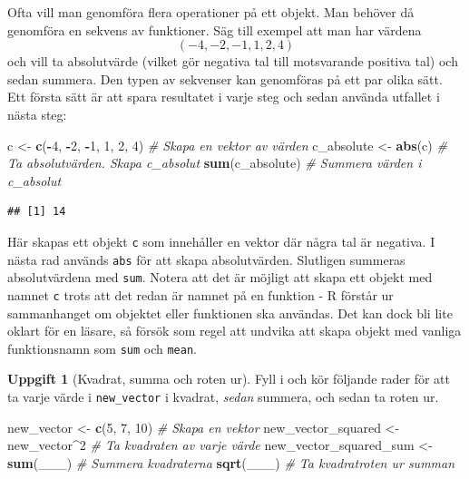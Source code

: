 \documentclass[
]{book}
\newenvironment{Shaded}{\begin{snugshade}}{\end{snugshade}}
\newcommand{\CommentTok}[1]{\textcolor[rgb]{0.56,0.35,0.01}{\textit{#1}}}
\newcommand{\DecValTok}[1]{\textcolor[rgb]{0.00,0.00,0.81}{#1}}
\newcommand{\FunctionTok}[1]{\textcolor[rgb]{0.13,0.29,0.53}{\textbf{#1}}}
\newcommand{\NormalTok}[1]{#1}
\newcommand{\OtherTok}[1]{\textcolor[rgb]{0.56,0.35,0.01}{#1}}
\newcommand{\SpecialCharTok}[1]{\textcolor[rgb]{0.81,0.36,0.00}{\textbf{#1}}}
\theoremstyle{definition}
\theoremstyle{definition}
\theoremstyle{definition}
\newtheorem{exercise}{Uppgift}[chapter]
\theoremstyle{definition}
\theoremstyle{remark}
\begin{document}
Ofta vill man genomföra flera operationer på ett objekt. Man behöver då genomföra en sekvens av funktioner. Säg till exempel att man har värdena \[(-4, -2, -1, 1, 2, 4)\] och vill ta absolutvärde (vilket gör negativa tal till motsvarande positiva tal) och sedan summera.
Den typen av sekvenser kan genomföras på ett par olika sätt. Ett första sätt är att spara resultatet i varje steg och sedan använda utfallet i nästa steg:

\begin{Shaded}
\begin{Highlighting}[]
\NormalTok{c }\OtherTok{\textless{}{-}} \FunctionTok{c}\NormalTok{(}\SpecialCharTok{{-}}\DecValTok{4}\NormalTok{, }\SpecialCharTok{{-}}\DecValTok{2}\NormalTok{, }\SpecialCharTok{{-}}\DecValTok{1}\NormalTok{, }\DecValTok{1}\NormalTok{, }\DecValTok{2}\NormalTok{, }\DecValTok{4}\NormalTok{)   }\CommentTok{\# Skapa en vektor av värden}
\NormalTok{c\_absolute }\OtherTok{\textless{}{-}} \FunctionTok{abs}\NormalTok{(c)          }\CommentTok{\# Ta absolutvärden. Skapa c\_absolut}
\FunctionTok{sum}\NormalTok{(c\_absolute)               }\CommentTok{\# Summera värden i c\_absolut}
\end{Highlighting}
\end{Shaded}

\begin{verbatim}
## [1] 14
\end{verbatim}

Här skapas ett objekt \texttt{c} som innehåller en vektor där några tal är negativa. I nästa rad används \texttt{abs} för att skapa absolutvärden. Slutligen summeras absolutvärdena med \texttt{sum}.
Notera att det är möjligt att skapa ett objekt med namnet \texttt{c} trots att det redan är namnet på en funktion - R förstår ur sammanhanget om objektet eller funktionen ska användas. Det kan dock bli lite oklart för en läsare, så försök som regel att undvika att skapa objekt med vanliga funktionsnamn som \texttt{sum} och \texttt{mean}.

\begin{exercise}[Kvadrat, summa och roten ur]

Fyll i och kör följande rader för att ta varje värde i \texttt{new\_vector} i kvadrat, \emph{sedan} summera, och sedan ta roten ur.

\begin{Shaded}
\begin{Highlighting}[]
\NormalTok{new\_vector }\OtherTok{\textless{}{-}} \FunctionTok{c}\NormalTok{(}\DecValTok{5}\NormalTok{, }\DecValTok{7}\NormalTok{, }\DecValTok{10}\NormalTok{)          }\CommentTok{\# Skapa en vektor}
\NormalTok{new\_vector\_squared }\OtherTok{\textless{}{-}}\NormalTok{ new\_vector}\SpecialCharTok{\^{}}\DecValTok{2} \CommentTok{\# Ta kvadraten av varje värde}
\NormalTok{new\_vector\_squared\_sum }\OtherTok{\textless{}{-}} \FunctionTok{sum}\NormalTok{(\_\_\_) }\CommentTok{\# Summera kvadraterna}
\FunctionTok{sqrt}\NormalTok{(\_\_\_)                          }\CommentTok{\# Ta kvadratroten ur summan}
\end{Highlighting}
\end{Shaded}

\end{exercise}
\end{document}
